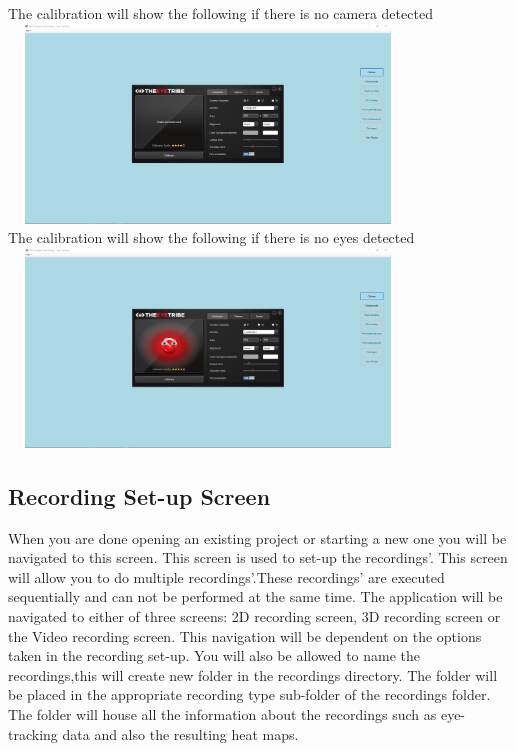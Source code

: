 The calibration will show the following if there is no camera detected\\


\includegraphics[width=400px,height=200px]{./Images/NoCameraCalibration.PNG}\\

The calibration will show the following if there is no eyes detected\\


\includegraphics[width=400px,height=200px]{./Images/NoEyeCalibration.PNG}\\




\subsection{Recording Set-up Screen}
When you are done opening an existing project or starting a new one you will be navigated to this screen. This screen is used to set-up the recordings'. This screen will allow you to do multiple recordings'.These recordings' are executed sequentially and can not be performed at the same time.
The application will be navigated to either of three screens: 2D recording screen, 3D recording screen or the Video recording screen. This navigation will be dependent on the options taken in the recording set-up.
You will also be allowed to name the recordings,this will create new folder in the recordings directory. The folder will be placed in the appropriate recording type sub-folder of the recordings folder. The folder will house all the information about the recordings such as eye-tracking data and also the resulting heat maps.

